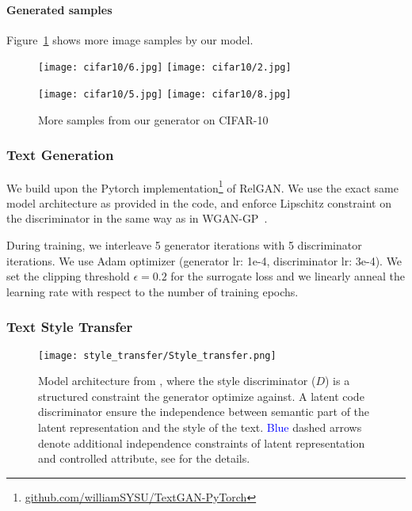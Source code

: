 \documentclass{article}
\newcommand{\0}{\bm{0}}
\begin{document}
\paragraph{Generated samples} 
Figure~\ref{appendix:fig:samples} shows more image samples by our model.

\begin{figure}[t]
\vskip 0.2in
\begin{center}
\centerline{\texttt{[image: cifar10/6.jpg]}
            \texttt{[image: cifar10/2.jpg]}}
\centerline{\texttt{[image: cifar10/5.jpg]}
            \texttt{[image: cifar10/8.jpg]}}
\caption{More samples from our generator on CIFAR-10}
\label{appendix:fig:samples}
\end{center}
\vskip -0.2in
\end{figure}

\subsubsection{Text Generation}
We build upon the Pytorch implementation\footnote{\href{https://github.com/williamSYSU/TextGAN-PyTorch}{github.com/williamSYSU/TextGAN-PyTorch}} of RelGAN. We use the exact same model architecture as provided in the code, and enforce Lipschitz constraint on the discriminator in the same way as in WGAN-GP~\cite{WGAN}. 

During training, we interleave 5 generator iterations with 5 discriminator iterations. We use Adam optimizer (generator lr: 1e-4, discriminator lr: 3e-4). We set the clipping threshold $\epsilon=0.2$ for the surrogate loss and we linearly anneal the learning rate with respect to the number of training epochs.

\subsubsection{Text Style Transfer}
\begin{figure}[t]
\vskip 0.2in
\begin{center}
\centerline{\texttt{[image: style\_transfer/Style\_transfer.png]}}
\caption{Model architecture from \cite{tikhonov2019style}, where the style discriminator ($D$) is a structured constraint the generator optimize against. A latent code discriminator ensure the independence between semantic part of the latent representation and the style of the text. \textcolor{blue}{Blue} dashed arrows denote additional independence constraints of latent representation and controlled attribute, see \cite{tikhonov2019style} for the details.}
\label{appendix:fig:style_transfer_arch}
\end{center}
\vskip -0.2in
\end{figure}
\end{document}
